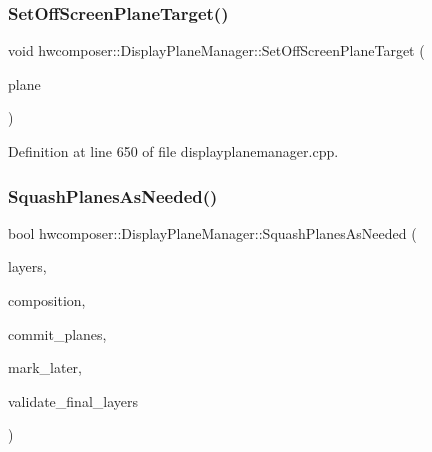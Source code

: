 \subsubsection{\texorpdfstring{Set\+Off\+Screen\+Plane\+Target()}{SetOffScreenPlaneTarget()}}
{\footnotesize\ttfamily void hwcomposer\+::\+Display\+Plane\+Manager\+::\+Set\+Off\+Screen\+Plane\+Target (\begin{DoxyParamCaption}\item[{\mbox{\hyperlink{classhwcomposer_1_1DisplayPlaneState}{Display\+Plane\+State}} \&}]{plane }\end{DoxyParamCaption})}



Definition at line 650 of file displayplanemanager.\+cpp.


\begin{DoxyCode}{0}
\end{DoxyCode}
\mbox{\label{classhwcomposer_1_1DisplayPlaneManager_ada91a47d462537740543db7c70d07f8e}} 
\subsubsection{\texorpdfstring{Squash\+Planes\+As\+Needed()}{SquashPlanesAsNeeded()}}
{\footnotesize\ttfamily bool hwcomposer\+::\+Display\+Plane\+Manager\+::\+Squash\+Planes\+As\+Needed (\begin{DoxyParamCaption}\item[{const std\+::vector$<$ \mbox{\hyperlink{structhwcomposer_1_1OverlayLayer}{Overlay\+Layer}} $>$ \&}]{layers,  }\item[{\mbox{\hyperlink{namespacehwcomposer_adf383ae435d39a5631a8ad82e7fa18a4}{Display\+Plane\+State\+List}} \&}]{composition,  }\item[{std\+::vector$<$ \mbox{\hyperlink{structhwcomposer_1_1OverlayPlane}{Overlay\+Plane}} $>$ \&}]{commit\+\_\+planes,  }\item[{std\+::vector$<$ \mbox{\hyperlink{classhwcomposer_1_1NativeSurface}{Native\+Surface}} $\ast$$>$ \&}]{mark\+\_\+later,  }\item[{bool $\ast$}]{validate\+\_\+final\+\_\+layers }\end{DoxyParamCaption})}



